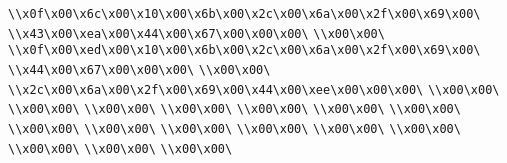 \verb|\\x0f\x00\x6c\x00\x10\x00\x6b\x00\x2c\x00\x6a\x00\x2f\x00\x69\x00\|\newline
\verb|\\x43\x00\xea\x00\x44\x00\x67\x00\x00\x00\|\newline
\verb|\\x00\x00\|\newline
\verb|\\x0f\x00\xed\x00\x10\x00\x6b\x00\x2c\x00\x6a\x00\x2f\x00\x69\x00\|\newline
\verb|\\x44\x00\x67\x00\x00\x00\|\newline
\verb|\\x00\x00\|\newline
\verb|\\x2c\x00\x6a\x00\x2f\x00\x69\x00\x44\x00\xee\x00\x00\x00\|\newline
\verb|\\x00\x00\|\newline
\verb|\\x00\x00\|\newline
\verb|\\x00\x00\|\newline
\verb|\\x00\x00\|\newline
\verb|\\x00\x00\|\newline
\verb|\\x00\x00\|\newline
\verb|\\x00\x00\|\newline
\verb|\\x00\x00\|\newline
\verb|\\x00\x00\|\newline
\verb|\\x00\x00\|\newline
\verb|\\x00\x00\|\newline
\verb|\\x00\x00\|\newline
\verb|\\x00\x00\|\newline
\verb|\\x00\x00\|\newline
\verb|\\x00\x00\|\newline
\verb|\\x00\x00\|\newline
